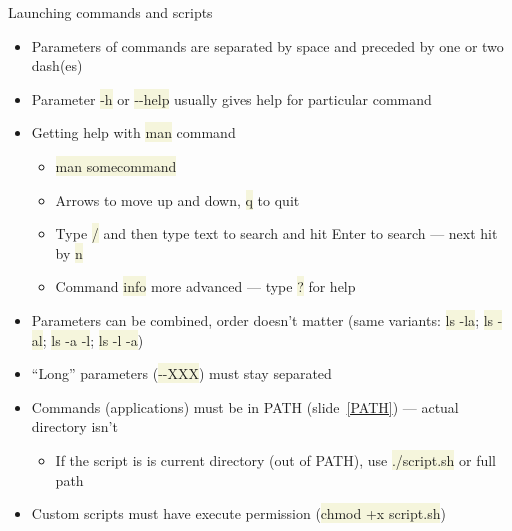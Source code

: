 \documentclass[compress, xelatex, 11pt, xcolor=svgnames, aspectratio=169,
	hyperref={
		bookmarks=true,
		unicode=true,
		colorlinks=true,
		pdftitle={Linux, command line and MetaCentrum},
		plainpages=false,
		pdfauthor={Vojtech Zeisek},
		pdfsubject={Course about use of Linux command line, writing shell scripts and using MetaCentrum of CESNET},
		pdfcreator={XeLaTeX},
		pdfkeywords={Linux, GNU, BASH, shell, command line, MetaCentrum},
		linkcolor=DarkRed, %
		anchorcolor=DarkBlue, %
		citecolor=Indigo, %
		filecolor=NavyBlue, %
		menucolor=DarkMagenta, %
		urlcolor=DarkBlue, %
		},
	url={hyphens, lowtilde} %
	]{beamer}
\renewcommand{\texttt}[1]{\colorbox{Beige}{{\ttfamily #1}}}
\begin{document}
\begin{frame}{Launching commands and scripts}
	\begin{itemize}
		\item Parameters of commands are separated by space and preceded by one or two dash(es)
		\item Parameter \texttt{-h} or \texttt{-{-}help} usually gives help for particular command
		\item Getting help with \texttt{man} command
		\begin{itemize}
			\item \texttt{man somecommand}
			\item Arrows to move up and down, \texttt{q} to quit
			\item Type \texttt{/} and then type text to search and hit Enter to search --- next hit by \texttt{n}
			\item Command \texttt{info} more advanced --- type \texttt{?} for help
		\end{itemize}
		\item Parameters can be combined, order doesn't matter (same variants: \texttt{ls -la}; \texttt{ls -al}; \texttt{ls -a -l}; \texttt{ls -l -a})
		\item \enquote{Long} parameters (\texttt{-{-}XXX}) must stay separated
		\item Commands (applications) must be in PATH (slide~\ref{PATH}) --- actual directory isn't
		\begin{itemize}
			\item If the script is is current directory (out of PATH), use \texttt{./script.sh} or full path
		\end{itemize}
		\item Custom scripts must have execute permission (\texttt{chmod +x script.sh})
	\end{itemize}
\end{frame}
\end{document}
